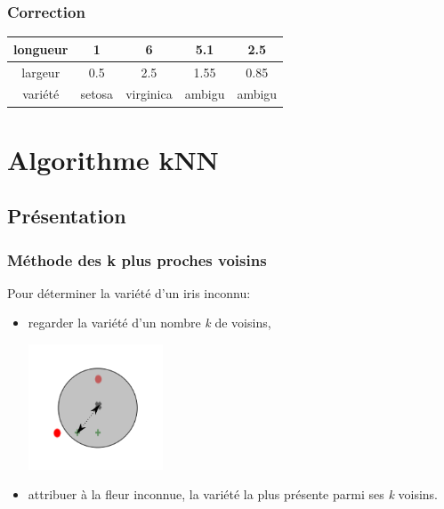 \documentclass[svgnames,11pt]{beamer}
\begin{document}
\begin{frame}
    \frametitle{Correction}
    \begin{tabular}{|*{5}{c|}}
        \hline
        longueur&1&6 &5.1 &2.5 \\
        \hline
        largeur&0.5&2.5& 1.55&0.85 \\
        \hline
        variété&setosa&virginica&ambigu&ambigu\\
        \hline
    \end{tabular}
    

\end{frame}
\section{Algorithme kNN}
\subsection{Présentation}
\begin{frame}
    \frametitle{Méthode des \textbf{k plus proches voisins}}

    Pour déterminer la variété d'un iris inconnu:
    \begin{itemize}
        \item<1-> regarder la variété d'un nombre \emph{k} de voisins,
        \begin{center}
            \includegraphics[width=4cm]{ressources/zoom-k3-slides.png}
        \end{center}
        \item <2-> attribuer à la fleur inconnue, la variété la plus présente parmi ses \emph{k} voisins.
    \end{itemize}

\end{frame}
\end{document}
